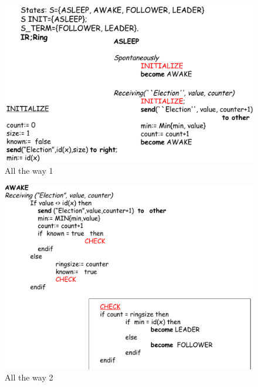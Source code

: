 \documentclass[12pt]{article}
\begin{document}
			\begin{figure}[h!]
				\centering
				\includegraphics[scale=0.30]{img/allalg.png}
				\caption{All the way 1}
			\end{figure}
			\begin{figure}[h!]
				\centering
				\includegraphics[scale=0.30]{img/allalg1.png}
				\caption{All the way 2}
			\end{figure}
			
\end{document}

